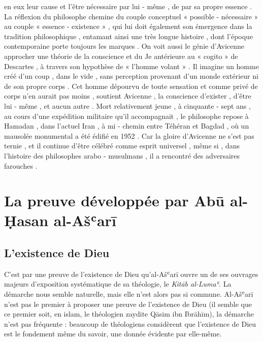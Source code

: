 en eux leur cause et l’être nécessaire par lui - même , de par sa propre essence . La réflexion du philosophe chemine du couple conceptuel « possible - nécessaire » au couple « essence - existence » , qui lui doit également son émergence dans la tradition philosophique , entamant ainsi une très longue histoire , dont l’époque contemporaine porte toujours les marques . On voit aussi le génie d’Avicenne approcher une théorie de la conscience et du Je antérieure au « cogito » de Descartes , à travers son hypothèse de « l’homme volant » . Il imagine un homme créé d’un coup , dans le vide , sans perception provenant d’un monde extérieur ni de son propre corps . Cet homme dépourvu de toute sensation et comme privé de corps n’en aurait pas moins , soutient Avicenne , la conscience d’exister , d’être lui - même , et aucun autre . Mort relativement jeune , à cinquante - sept ans , au cours d’une expédition militaire qu’il accompagnait , le philosophe repose à Hamadan , dans l’actuel Iran , à mi - chemin entre Téhéran et Bagdad , où un mausolée monumental a été édifié en 1952 . Car la gloire d’Avicenne ne s’est pas ternie , et il continue d’être célébré comme esprit universel , même si , dans l’histoire des philosophes arabo - musulmans , il a rencontré des adversaires farouches .


\section{La preuve développée par Abū al-Ḥasan al-Ašʿarī}

  
  \subsection{L'existence de Dieu}
  
 

C'est par une preuve de l'existence de Dieu qu'al-Ašʿarī ouvre un de ses
ouvrages majeurs d'exposition systématique de sa théologie, le
\emph{Kitāb al-Lumaʿ}. La démarche nous
semble naturelle, mais elle n'est alors pas si commune. Al-Ašʿarī n'est
pas le premier à proposer une preuve de l'existence de Dieu (il semble
que ce premier soit, en islam, le théologien zaydite Qāsim ibn Ibrāhīm),
la démarche n'est pas fréquente : beaucoup de théologiens considèrent
que l'existence de Dieu est le fondement même du savoir, une donnée
évidente par elle-même.




